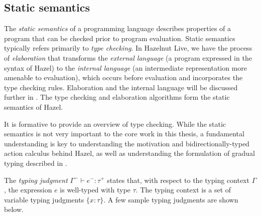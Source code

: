 \subsection{Static semantics}
\label{sec:static-semantics}

The \textit{static semantics} of a programming language describes properties of a program that can be checked prior to program evaluation. Static semantics typically refers primarily to \textit{type checking}. In Hazelnut Live, we have the process of \textit{elaboration} that transforms the \textit{external language} (a program expressed in the syntax of Hazel) to the \textit{internal language} (an intermediate representation more amenable to evaluation), which occurs before evaluation and incorporates the type checking rules. Elaboration and the internal language will be discussed further in . The type checking and elaboration algorithms form the static semantics of Hazel.

It is formative to provide an overview of type checking. While the static semantics is not very important to the core work in this thesis, a fundamental understanding is key to understanding the motivation and bidirectionally-typed action calculus behind Hazel, as well as understanding the formulation of gradual typing described in .

The \textit{typing judgment} $\Gamma^-\vdash e^-:\tau^+$ states that, with respect to the typing context $\Gamma$, the expression $e$ is well-typed with type $\tau$. The typing context is a set of variable typing judgments $\{x:\tau\}$. A few sample typing judgments are shown below.

\begin{singlespace}
\end{singlespace}

